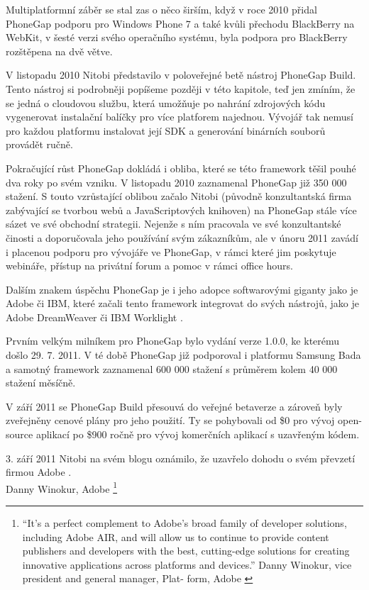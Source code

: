 Multiplatformní záběr se stal zas o něco širším, když v roce 2010 přidal PhoneGap podporu pro Windows Phone 7 a také kvůli přechodu BlackBerry na WebKit, v šesté verzi svého operačního systému, byla podpora pro BlackBerry rozštěpena na dvě větve.

V listopadu 2010 Nitobi představilo v poloveřejné betě nástroj PhoneGap Build. Tento nástroj si podrobněji popíšeme později v této kapitole, teď jen zmíním, že se jedná o cloudovou službu, která umožňuje po nahrání zdrojových kódu vygenerovat instalační balíčky pro více platforem najednou. Vývojář tak nemusí pro každou platformu instalovat její SDK a generování binárních souborů provádět ručně. \cite{announcing_phonegap_build_beta} 

Pokračující růst PhoneGap dokládá i obliba, které se této framework těšil pouhé dva roky po svém vzniku. V listopadu 2010 zaznamenal PhoneGap již 350 000 stažení. S touto vzrůstající oblibou začalo Nitobi (původně konzultantská firma zabývající se tvorbou webů a JavaScriptových knihoven) na PhoneGap stále více sázet ve své obchodní strategii. Nejenže s ním pracovala ve své konzultantské činosti a doporučovala jeho používání svým zákazníkům, ale v únoru 2011 zavádí i placenou podporu pro vývojáře ve PhoneGap, v rámci které jim poskytuje webináře, přístup na privátní forum a pomoc v rámci office hours.

Dalším znakem úspěchu PhoneGap je i jeho adopce softwarovými giganty jako je Adobe či IBM, které začali tento framework integrovat do svých nástrojů, jako je Adobe DreamWeaver či IBM Worklight \cite{phonegap_worklight_enterprise,dreamweaver_supports_phonegap}. 

Prvním velkým milníkem pro PhoneGap bylo vydání verze 1.0.0, ke kterému došlo 29. 7. 2011. V té době PhoneGap již podporoval i platformu Samsung Bada a samotný framework zaznamenal 600 000 stažení s průměrem kolem 40 000 stažení měsíčně. \cite{phonegap_1_released} 

V září 2011 se PhoneGap Build přesouvá do veřejné betaverze a zároveň byly zveřejněny cenové plány pro jeho použití. Ty se pohybovali od \$0 pro vývoj open-source aplikací po \$900 ročně pro vývoj komerčních aplikací s uzavřeným kódem. \cite{phonegap_build_open_beta}

3. září 2011 Nitobi na svém blogu oznámilo, že uzavřelo dohodu o svém převzetí firmou Adobe \cite{nitobi_adobe1}. \\

\textit{} Danny Winokur, Adobe \cite{nitobi_adobe1}
\footnote{“It’s a perfect complement to Adobe’s broad family of developer solutions, including Adobe AIR, and will allow us to continue to provide content publishers and developers with the best, cutting-edge solutions for creating innovative applications across platforms and devices.” Danny Winokur, vice president and general manager, Plat-
form, Adobe \cite{nitobi_adobe1}}\\

